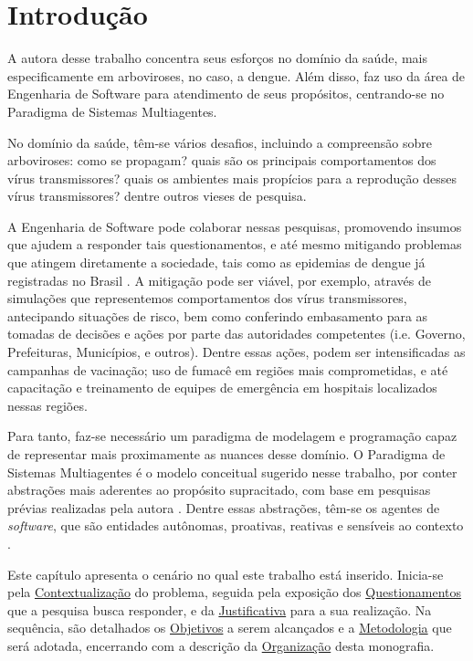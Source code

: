 \chapter{Introdução}
\label{1-introducao}

A autora desse trabalho concentra seus esforços no domínio da saúde, mais especificamente
em arboviroses, no caso, a dengue. Além disso, faz uso da área de Engenharia de Software
para atendimento de seus propósitos, centrando-se no Paradigma de Sistemas Multiagentes.

No domínio da saúde, têm-se vários desafios, incluindo a compreensão sobre arboviroses:
como se propagam? quais são os principais comportamentos dos vírus transmissores?
quais os ambientes mais propícios para a reprodução desses vírus transmissores?
dentre outros vieses de pesquisa.

A Engenharia de Software pode colaborar nessas pesquisas, promovendo insumos que ajudem
a responder tais questionamentos, e até mesmo mitigando problemas que atingem diretamente
a sociedade, tais como as epidemias de dengue já registradas no Brasil \cite{fepese2024}.
A mitigação pode ser viável, por exemplo, através de simulações que representemos
comportamentos dos vírus transmissores, antecipando situações de risco, bem como conferindo
embasamento para as tomadas de decisões e ações por parte das autoridades competentes
(i.e. Governo, Prefeituras, Municípios, e outros). Dentre essas ações, podem ser
intensificadas as campanhas de vacinação; uso de fumacê em regiões mais comprometidas,
e até capacitação e treinamento de equipes de emergência em hospitais localizados nessas regiões.

Para tanto, faz-se necessário um paradigma de modelagem e programação capaz de representar
mais proximamente as nuances desse domínio. O Paradigma de Sistemas Multiagentes é o modelo
conceitual sugerido nesse trabalho, por conter abstrações mais aderentes ao propósito supracitado,
com base em pesquisas prévias realizadas pela autora \cite{costa2025}.
Dentre essas abstrações, têm-se os agentes de \textit{software}, que são entidades autônomas,
proativas, reativas e sensíveis ao contexto \cite{wooldridge2009}.

Este capítulo apresenta o cenário no qual este trabalho está inserido. Inicia-se
pela \hyperref[1-contextualizacao]{Contextualização} do problema, seguida pela exposição
dos \hyperref[1-questao]{Questionamentos} que a pesquisa busca responder, e da
\hyperref[1-justificativa]{Justificativa} para a sua realização. Na sequência, são
detalhados os  \hyperref[1-objetivos]{Objetivos} a serem alcançados e a
\hyperref[1-metodologia]{Metodologia} que será adotada, encerrando com a descrição da 
\hyperref[1-organizacao]{Organização} desta monografia.

